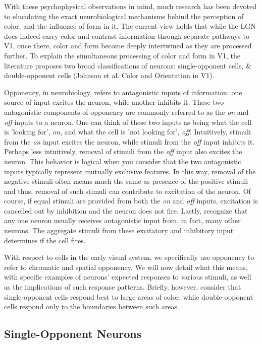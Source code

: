 \documentclass[journal,onecolumn]{IEEEtran}
\begin{document}
With these psychophysical observations in mind, much research has been devoted to elucidating the exact neurobiological mechanisms behind the perception of color, and the influence of form in it. The current view holds that while the LGN does indeed carry color and contrast information through separate pathways to V1, once there, color and form become deeply intertwined as they are processed further. To explain the simultaneous processing of color and form in V1, the literature proposes two broad classifications of neurons: single-opponent cells, \& double-opponent cells (Johnson et al. Color and Orientation in V1).

Opponency, in neurobiology, refers to antagonistic inputs of information: one source of input excites the neuron, while another inhibits it. These two antagonistic components of opponency are commonly referred to as the \textit{on} and \textit{off} inputs to a neuron. One can think of these two inputs as being what the cell is 'looking for', \textit{on}, and what the cell is 'not looking for', \textit{off}. Intuitively, stimuli from the \textit{on} input excites the neuron, while stimuli from the \textit{off} input inhibits it. Perhaps less intuitively, removal of stimuli from the \textit{off} input also excites the neuron. This behavior is logical when you consider that the two antagonistic inputs typically represent mutually exclusive features. In this way, removal of the negative stimuli often means much the same as presence of the positive stimuli and thus, removal of such stimuli can contribute to excitation of the neuron. Of course, if equal stimuli are provided from both the \textit{on} and \textit{off} inputs, excitation is cancelled out by inhibition and the neuron does not fire. Lastly, recognize that any one neuron usually receives antagonistic input from, in fact, many other neurons. The aggregate stimuli from these excitatory and inhibitory input determines if the cell fires.

With respect to cells in the early visual system, we specifically use opponency to refer to chromatic and spatial opponency. We will now detail what this means, with specific examples of neurons' expected responses to various stimuli, as well as the implications of such response patterns. Briefly, however, consider that single-opponent cells respond best to large areas of color, while double-opponent cells respond only to the boundaries between such areas.


\subsection*{Single-Opponent Neurons}
\end{document}
